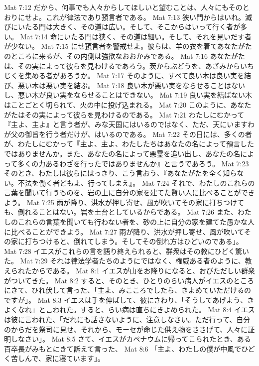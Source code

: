 Mat 7:12  だから、何事でも人々からしてほしいと望むことは、人々にもそのとおりにせよ。これが律法であり預言者である。
Mat 7:13  狭い門からはいれ。滅びにいたる門は大きく、その道は広い。そして、そこからはいって行く者が多い。
Mat 7:14  命にいたる門は狭く、その道は細い。そして、それを見いだす者が少ない。
Mat 7:15  にせ預言者を警戒せよ。彼らは、羊の衣を着てあなたがたのところに来るが、その内側は強欲なおおかみである。
Mat 7:16  あなたがたは、その実によって彼らを見わけるであろう。茨からぶどうを、あざみからいちじくを集める者があろうか。
Mat 7:17  そのように、すべて良い木は良い実を結び、悪い木は悪い実を結ぶ。
Mat 7:18  良い木が悪い実をならせることはないし、悪い木が良い実をならせることはできない。
Mat 7:19  良い実を結ばない木はことごとく切られて、火の中に投げ込まれる。
Mat 7:20  このように、あなたがたはその実によって彼らを見わけるのである。
Mat 7:21  わたしにむかって『主よ、主よ』と言う者が、みな天国にはいるのではなく、ただ、天にいますわが父の御旨を行う者だけが、はいるのである。
Mat 7:22  その日には、多くの者が、わたしにむかって『主よ、主よ、わたしたちはあなたの名によって預言したではありませんか。また、あなたの名によって悪霊を追い出し、あなたの名によって多くの力あるわざを行ったではありませんか』と言うであろう。
Mat 7:23  そのとき、わたしは彼らにはっきり、こう言おう、『あなたがたを全く知らない。不法を働く者どもよ、行ってしまえ』。
Mat 7:24  それで、わたしのこれらの言葉を聞いて行うものを、岩の上に自分の家を建てた賢い人に比べることができよう。
Mat 7:25  雨が降り、洪水が押し寄せ、風が吹いてその家に打ちつけても、倒れることはない。岩を土台としているからである。
Mat 7:26  また、わたしのこれらの言葉を聞いても行わない者を、砂の上に自分の家を建てた愚かな人に比べることができよう。
Mat 7:27  雨が降り、洪水が押し寄せ、風が吹いてその家に打ちつけると、倒れてしまう。そしてその倒れ方はひどいのである」。
Mat 7:28  イエスがこれらの言を語り終えられると、群衆はその教にひどく驚いた。
Mat 7:29  それは律法学者たちのようにではなく、権威ある者のように、教えられたからである。
Mat 8:1  イエスが山をお降りになると、おびただしい群衆がついてきた。
Mat 8:2  すると、そのとき、ひとりのらい病人がイエスのところにきて、ひれ伏して言った、「主よ、みこころでしたら、きよめていただけるのですが」。
Mat 8:3  イエスは手を伸ばして、彼にさわり、「そうしてあげよう、きよくなれ」と言われた。すると、らい病は直ちにきよめられた。
Mat 8:4  イエスは彼に言われた、「だれにも話さないように、注意しなさい。ただ行って、自分のからだを祭司に見せ、それから、モーセが命じた供え物をささげて、人々に証明しなさい」。
Mat 8:5  さて、イエスがカペナウムに帰ってこられたとき、ある百卒長がみもとにきて訴えて言った、
Mat 8:6  「主よ、わたしの僕が中風でひどく苦しんで、家に寝ています」。
